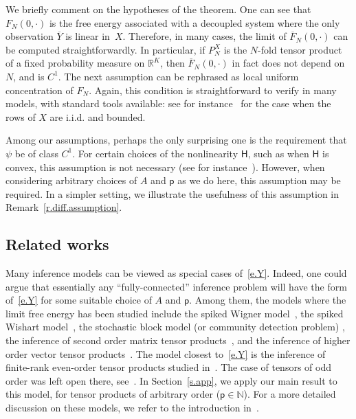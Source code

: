 \documentclass[AHL,Unicode,longabstracts,published]{cedram}
\newcommand{\N}{\mathbb{N}}
\newcommand{\R}{\mathbb{R}}
\renewcommand{\H}{\mathsf{H}}
\newcommand{\sfp}{\mathsf{p}}
\renewcommand{\bar}{\overline}
\begin{document}
We briefly comment on the hypotheses of the theorem. One can see that $F_N(0,\cdot)$ is the free energy associated with a decoupled system where the only observation $\bar Y$ is linear in~$X$. Therefore, in many cases, the limit of $\bar F_N(0,\cdot)$ can be computed straightforwardly. In particular, if $P_N^X$ is the $N$-fold tensor product of a fixed probability measure on $\R^K$, then $\bar F_N(0,\cdot)$ in fact does not depend on $N$, and is $C^1$. The next assumption can be rephrased as local uniform concentration of $F_N$. Again, this condition is straightforward to verify in many models, with standard tools available: see for instance~\cite[Lemma~C.1]{HBJ} for the case when the rows of $X$ are i.i.d. and bounded.

Among our assumptions, perhaps the only surprising one is the requirement that $\psi$ be of class $C^1$. For certain choices of the nonlinearity $\H$, such as when $\H$ is convex, this assumption is not necessary (see for instance~\cite{HBJ}). However, when considering arbitrary choices of $A$ and $\sfp$ as we do here, this assumption may be required. In a simpler setting, we illustrate the usefulness of this assumption in Remark~\ref{r.diff.assumption}.

\subsection{Related works} 
Many inference models can be viewed as special cases of~\eqref{e.Y}. Indeed, one could argue that essentially any ``fully-connected'' inference problem will have the form of~\eqref{e.Y} for some suitable choice of $A$ and $\sfp$. Among them, the models where the limit free energy has been studied include the spiked Wigner model~\cite{barbier2016, barbier2019adaptive,lelarge2019fundamental, mourrat2018hamilton, mourrat2019hamilton}, the spiked Wishart model~\cite{barbier2017layered,chen2020hamilton, kadmon2018statistical, luneau2020high,miolane2017fundamental}, the stochastic block model (or community detection problem) \cite{lelarge2019fundamental, mayya2019mutualIEEE, reeves2019geometryIEEE}, the inference of second order matrix tensor products~\cite{reeves2020information}, and the inference of higher order vector tensor products~\cite{barbier2019adaptive,lesieur2017statistical, mourrat2018hamilton}. The model closest to~\eqref{e.Y} is the inference of finite-rank even-order tensor products studied in~\cite{luneau2019mutual}. The case of tensors of odd order was left open there, see~\cite[Section~7]{luneau2019mutual}. In Section~\ref{s.app}, we apply our main result to this model, for tensor products of arbitrary order ($\sfp \in \N$). For a more detailed discussion on these models, we refer to the introduction in~\cite{HBJ}.
\end{document}
